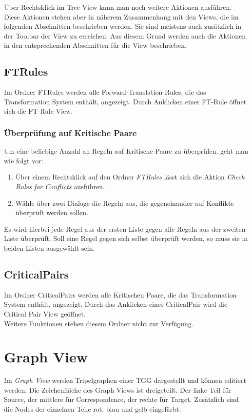 Über Rechtsklick im Tree View kann man noch weitere Aktionen ausführen. Diese Aktionen stehen aber in näherem Zusammenhang mit den Views, die im folgenden Abschnitten beschrieben werden. Sie sind meistens auch zusätzlich in der Toolbar der View zu erreichen. Aus diesem Grund werden auch die Aktionen in den entsprechenden Abschnitten für die View beschrieben.

\subsection{FTRules}
Im Ordner FTRules werden alle Forward-Translation-Rules, die das Transformation System enthält, angezeigt. Durch Anklicken einer FT-Rule öffnet sich  die FT-Rule View.

\subsubsection{Überprüfung auf Kritische Paare}
Um eine beliebige Anzahl an Regeln auf Kritische Paare zu überprüfen, geht man wie folgt vor:

\begin{enumerate}
\item Über einem Rechtsklick auf den Ordner \textit{FTRules} lässt sich die Aktion \textit{Check Rules for Conflicts} ausführen.
\item Wähle über zwei Dialoge die Regeln aus, die gegeneinander auf Konflikte überprüft werden sollen.
\end{enumerate}

Es wird hierbei jede Regel aus der ersten Liste gegen alle Regeln aus der zweiten Liste überprüft. Soll eine Regel gegen sich selbst überprüft werden, so muss sie in beiden Listen ausgewählt sein.

\subsection{CriticalPairs}
Im Ordner CriticalPairs werden alle Kritischen Paare, die das Transformation System enthält, angezeigt.
Durch das Anklicken eines CriticalPair wird die Critical Pair View geöffnet.\\
Weitere Funktionen stehen diesem Ordner nicht zur Verfügung.

\section{Graph View}
Im \emph{Graph View} werden Tripelgraphen einer TGG dargestellt und können editiert werden. Die Zeichenfläche des Graph Views ist dreigeteilt. Der linke Teil für Source, der mittlere für Correspondence, der rechte für Target. Zusätzlich sind die Nodes der einzelnen Teile rot, blau und gelb eingefärbt.

